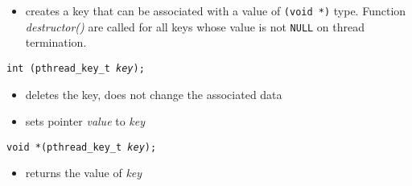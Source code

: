 

\begin{slide}
\begin{itemize}
\item creates a key that can be associated with a value of
\texttt{(void *)} type.  Function \emph{destructor()} are called for all keys
whose value is not \texttt{NULL} on thread termination.
\end{itemize}
\texttt{int (pthread\_key\_t \emph{key});}
\begin{itemize}
\item deletes the key, does not change the associated data
\end{itemize}
\begin{itemize}
\item sets pointer \emph{value} to \emph{key}
\end{itemize}
\texttt{void *(pthread\_key\_t \emph{key});}
\begin{itemize}
\item returns the value of \emph{key}
\end{itemize}
\end{slide}

